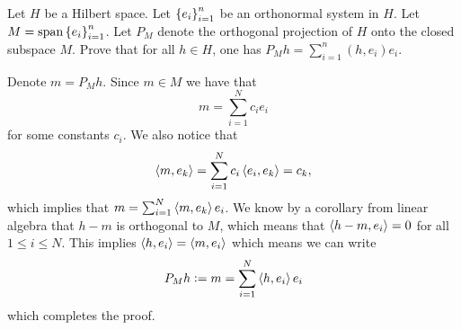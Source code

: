 \documentclass[11pt,a4paper]{article}
\begin{document}
\begin{exercise}
  Let $H$ be a Hilbert space.
  Let $\left\{e_i\right\}_{i=1}^{n}$ be an orthonormal system in $H$.
  Let $M = \operatorname{span}\left\{e_i\right\}_{i=1}^{n}$.
  Let $P_M$ denote the orthogonal projection of $H$
  onto the closed subspace $M$.
  Prove that for all $h \in H$,
  one has $P_M h = \sum_{i=1}^{n} (h,e_i) e_i$.
\end{exercise}
\begin{solution}
  Denote $m = P_M h$.
  Since $m \in M$ we have that
  \[
    m = \sum_{i=1}^{N} c_i e_i
  \]
  for some constants $c_i$.
  We also notice that
  \[
    \left\langle m, e_k \right\rangle = \sum_{i=1}^{N} c_i \left\langle e_i, e_k \right\rangle = c_k,
  \]
  which implies that $m = \sum_{i=1}^{N} \left\langle m, e_k \right\rangle e_i$.
  We know by a corollary from linear algebra that $h - m$ is orthogonal
  to $M$, which means that $\left\langle h - m, e_i \right\rangle = 0$ for all $1 \le i \le N$.
  This implies $\left\langle h, e_i \right\rangle = \left\langle m, e_i \right\rangle$ which means we can write
  \[
    P_M h := m = \sum_{i=1}^{N} \left\langle h, e_i \right\rangle e_i
  \]
  which completes the proof.
\end{solution}
\end{document}
